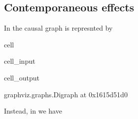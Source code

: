 \documentclass[letterpaper,10pt,english]{jupyterBook}
\begin{document}
\subsection{Contemporaneous effects}
\label{\detokenize{notebooks/structural_breaks_example:contemporaneous-effects}}
\sphinxAtStartPar
In  the causal graph is represnted by

\begin{sphinxuseclass}{cell}\begin{sphinxVerbatimInput}

\begin{sphinxuseclass}{cell_input}
\begin{sphinxVerbatim}[commandchars=\\\{\}]
   

  \PYG{p}{[}\PYG{p}{[}  \PYG{p}{]}
              \PYG{p}{[}  \PYG{p}{]}
              \PYG{p}{[} \PYG{p}{]}\PYG{p}{]}

\end{sphinxVerbatim}

\end{sphinxuseclass}\end{sphinxVerbatimInput}
\begin{sphinxVerbatimOutput}

\begin{sphinxuseclass}{cell_output}
\begin{sphinxVerbatim}[commandchars=\\\{\}]
\PYGZlt{}graphviz.graphs.Digraph at 0x1615d51d0\PYGZgt{}
\end{sphinxVerbatim}

\end{sphinxuseclass}\end{sphinxVerbatimOutput}

\end{sphinxuseclass}
\sphinxAtStartPar
Instead, in  we have
\end{document}
